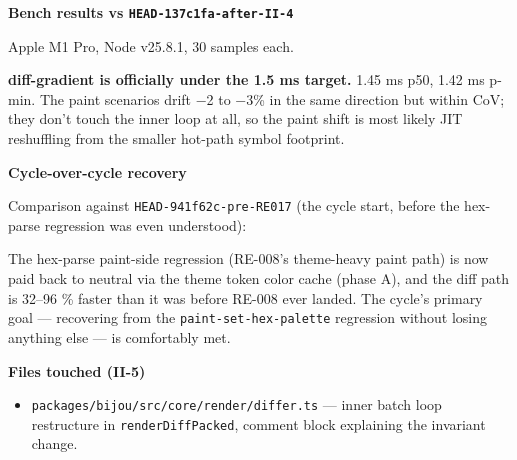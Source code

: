 \textbf{Bench results vs \texttt{H\allowbreak{}E\allowbreak{}A\allowbreak{}D\allowbreak{}-\allowbreak{}1\allowbreak{}3\allowbreak{}7\allowbreak{}c\allowbreak{}1\allowbreak{}f\allowbreak{}a\allowbreak{}-\allowbreak{}a\allowbreak{}f\allowbreak{}t\allowbreak{}e\allowbreak{}r\allowbreak{}-\allowbreak{}I\allowbreak{}I\allowbreak{}-\allowbreak{}4}}

Apple M1 Pro, Node v25.8.1, 30 samples each.



\textbf{diff-gradient is officially under the 1.5 ms target.} 1.45 ms p50, 1.42 ms p-min. The paint scenarios drift −2 to −3\% in the same direction but within CoV; they don't touch the inner loop at all, so the paint shift is most likely JIT reshuffling from the smaller hot-path symbol footprint.

\textbf{Cycle-over-cycle recovery}

Comparison against \texttt{H\allowbreak{}E\allowbreak{}A\allowbreak{}D\allowbreak{}-\allowbreak{}9\allowbreak{}4\allowbreak{}1\allowbreak{}f\allowbreak{}6\allowbreak{}2\allowbreak{}c\allowbreak{}-\allowbreak{}p\allowbreak{}r\allowbreak{}e\allowbreak{}-\allowbreak{}R\allowbreak{}E\allowbreak{}0\allowbreak{}1\allowbreak{}7} (the cycle start, before the hex-parse regression was even understood):



The hex-parse paint-side regression (RE-008's theme-heavy paint path) is now paid back to neutral via the theme token color cache (phase A), and the diff path is 32--96 \% faster than it was before RE-008 ever landed. The cycle's primary goal --- recovering from the \texttt{p\allowbreak{}a\allowbreak{}i\allowbreak{}n\allowbreak{}t\allowbreak{}-\allowbreak{}s\allowbreak{}e\allowbreak{}t\allowbreak{}-\allowbreak{}h\allowbreak{}e\allowbreak{}x\allowbreak{}-\allowbreak{}p\allowbreak{}a\allowbreak{}l\allowbreak{}e\allowbreak{}t\allowbreak{}t\allowbreak{}e} regression without losing anything else --- is comfortably met.

\textbf{Files touched (II-5)}

\begin{itemize}
\tightlist
\item
  \texttt{p\allowbreak{}a\allowbreak{}c\allowbreak{}k\allowbreak{}a\allowbreak{}g\allowbreak{}e\allowbreak{}s\allowbreak{}/\allowbreak{}b\allowbreak{}i\allowbreak{}j\allowbreak{}o\allowbreak{}u\allowbreak{}/\allowbreak{}s\allowbreak{}r\allowbreak{}c\allowbreak{}/\allowbreak{}c\allowbreak{}o\allowbreak{}r\allowbreak{}e\allowbreak{}/\allowbreak{}r\allowbreak{}e\allowbreak{}n\allowbreak{}d\allowbreak{}e\allowbreak{}r\allowbreak{}/\allowbreak{}d\allowbreak{}i\allowbreak{}f\allowbreak{}f\allowbreak{}e\allowbreak{}r\allowbreak{}.\allowbreak{}t\allowbreak{}s} --- inner batch loop restructure in \texttt{r\allowbreak{}e\allowbreak{}n\allowbreak{}d\allowbreak{}e\allowbreak{}r\allowbreak{}D\allowbreak{}i\allowbreak{}f\allowbreak{}f\allowbreak{}P\allowbreak{}a\allowbreak{}c\allowbreak{}k\allowbreak{}e\allowbreak{}d}, comment block explaining the invariant change.
\end{itemize}

